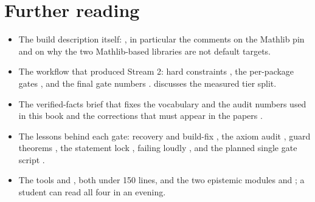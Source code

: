 \section*{Further reading}
\begin{itemize}[leftmargin=*,itemsep=2pt]
\item The build description itself:  , in particular
  the comments on the Mathlib pin and on why the two Mathlib-based libraries are not default
  targets.
\item The workflow that produced Stream 2: hard constraints , the per-package gates , and the final gate numbers
  .  discusses the measured tier split.
\item The verified-facts brief that fixes the vocabulary and the audit numbers used in this
  book  and the corrections that must
  appear in the papers .
\item The lessons behind each gate: recovery and build-fix ,
  the axiom audit , guard theorems ,
  the statement lock , failing loudly , and the planned single gate script .
\item The tools   and
   , both under 150 lines, and the two
  epistemic modules   and
   ; a student can read all four in an evening.
\end{itemize}
